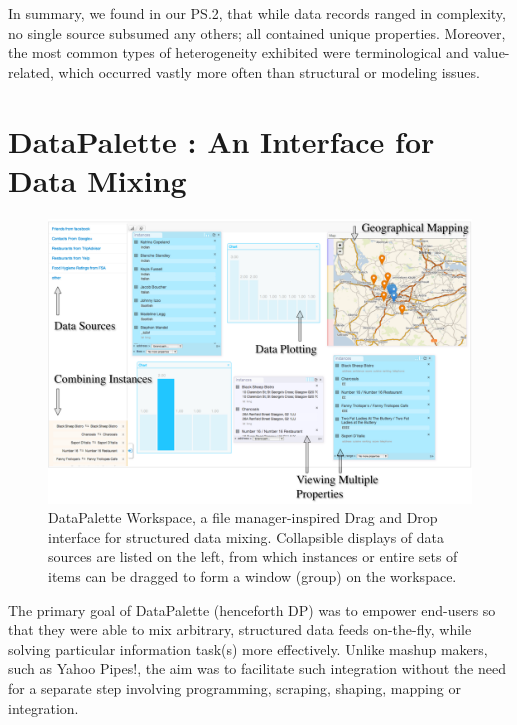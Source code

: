 \documentclass{sigchi}
\begin{document}
In summary, we found in our PS.2, that while data records ranged in complexity, no single source subsumed any others; all contained unique properties.  Moreover, the most common types of heterogeneity exhibited were terminological and value-related, which occurred vastly more often than structural or modeling issues.

\section{DataPalette : An Interface for Data Mixing}

\begin{figure}[thb]
\begin{center}
\includegraphics[width=18cm]{img/screenshot}
\caption{DataPalette Workspace, a file manager-inspired Drag and Drop interface for structured data mixing. Collapsible displays of data sources are listed on the left, from which instances or entire sets of items can be dragged to form a window (group) on the workspace.}
\label{fig:workspace}
\end{center}
\end{figure}

The primary goal of DataPalette (henceforth DP) was to empower end-users so that they were able to mix arbitrary, structured data feeds on-the-fly, while solving particular information task(s) more effectively.  Unlike mashup makers, such as Yahoo Pipes!, the aim was to facilitate such integration without the need for a separate step involving programming, scraping, shaping, mapping or integration. 
\end{document}
